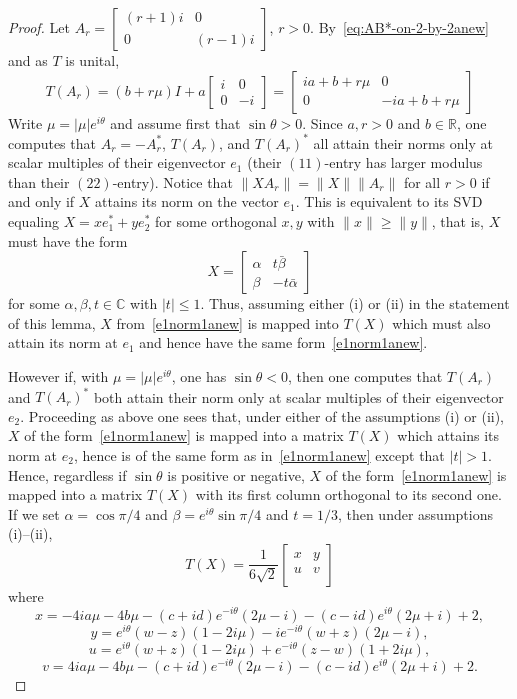 \documentclass[11pt]{article}
\numberwithin{equation}{section}
\def\IC{{\mathbb C}}
\def\IR{{\mathbb R}}
\begin{document}
\begin{proof}
Let $A_r = \begin{bmatrix} (r+1)i& 0 \\ 0 & (r-1)i \end{bmatrix}$, $r>0$. By~\eqref{eq:AB*-on-2-by-2anew} and as $T$ is unital,
$$T(A_r)=(b+r\mu) I +a\begin{bmatrix} i &0 \\ 0 & -i \end{bmatrix} = \begin{bmatrix}
 i a +b +r\mu  & 0 \\
 0 & -i a +b +r\mu
 \end{bmatrix} $$
Write $\mu=|\mu|e^{i\theta}$ and assume first that $\sin\theta>0$. Since $a,r>0$ and $b\in\IR$, one computes that
$A_r=-A_r^\ast$, $T(A_r)$, and $T(A_r)^\ast$ all
 attain their norms only at scalar multiples of their eigenvector $e_1$ (their $(11)$-entry has larger modulus than their $(22)$-entry).  Notice that $\|XA_r\| = \|X \| \|A_r\|$  for all $r > 0$ if and only if $X$
attains its norm on the vector $e_1$.
 This is equivalent to its SVD equaling $X =x e_1^\ast+ye_2^\ast$ for some orthogonal $x,y$ with $\|x\|\ge \|y\|$,  that is, $X$ must have the form
\begin{equation}\label{e1norm1anew}
X = \begin{bmatrix} \alpha & t \bar{\beta} \\ \beta & -t\bar{\alpha} \end{bmatrix}
\end{equation}
for some $\alpha, \beta, t \in \IC$ with $|t| \leq 1$. Thus, assuming either (i) or (ii) in the statement of this lemma, $X$ from~\eqref{e1norm1anew} is mapped into $T(X)$ which must also attain its norm at $e_1$ and hence have the same form~\eqref{e1norm1anew}.

However if, with $\mu=|\mu|e^{i\theta}$, one has $\sin\theta<0$, then  one computes that $T(A_r)$ and $T(A_r)^*$ both attain their
norm only at scalar multiples of their eigenvector $e_2$. Proceeding as above one sees that, under either of the assumptions (i) or (ii), $X$ of the form~\eqref{e1norm1anew} is mapped into a matrix $T(X)$ which attains its norm at $e_2$, hence is of the same form  as in~\eqref{e1norm1anew}  except that $|t| >1$. Hence, regardless if $\sin\theta$ is positive or negative, $X$ of the form~\eqref{e1norm1anew} is mapped into a matrix $T(X)$ with  its first  column orthogonal to its  second one.
 If we set $\alpha=\cos\pi/4$ and $\beta = e^{i\theta}\sin\pi/4$ and $t=1/3$, then under assumptions (i)--(ii),
$$T(X) = \frac{1}{6 \sqrt{2}}
\begin{bmatrix}
 x & y \\
 u & v \\
\end{bmatrix}$$
where
$$x=-4 i a \mu -4 b \mu -(c+i d) e^{-i \theta } (2 \mu -i)-(c-i d) e^{i \theta } (2 \mu +i)+2,$$
$$y =e^{i \theta } (w-z) (1-2 i \mu
   )-i e^{-i \theta } (w+z) (2 \mu -i),$$
$$u=e^{i \theta } (w+z) (1-2 i \mu )+e^{-i \theta } (z - w) (1 + 2 i  \mu),$$
$$v=4 i a \mu -4 b \mu -(c+i d) e^{-i \theta } (2 \mu
   -i)-(c-i d) e^{i \theta } (2 \mu +i)+2.$$


\end{proof}
\end{document}
